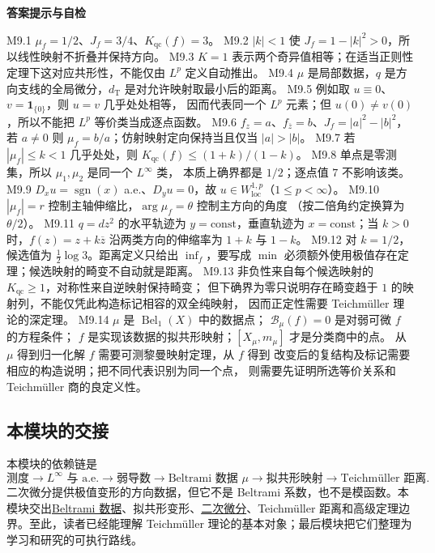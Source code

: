 \documentclass[UTF8,fontset=none,a4paper,11pt]{ctexart}
\theoremstyle{foundation-definition}
\theoremstyle{foundation-theorem}
\theoremstyle{foundation-proposition}
\theoremstyle{foundation-example}
\theoremstyle{foundation-remark}
\theoremstyle{foundation-theorem}
\newcommand{\term}[2]{\hyperref[#1]{#2}}
\newenvironment{answerkey}{%
\begin{mdframed}[backgroundcolor=examplebg,linecolor=examplepurple,linewidth=1.0pt,
  leftline=true,rightline=false,topline=false,bottomline=false,
  skipabove=7pt,skipbelow=8pt,innerleftmargin=10pt,innerrightmargin=8pt,
  innertopmargin=6pt,innerbottommargin=6pt]
{\sffamily\bfseries\color{examplepurple}答案提示与自检}\par\smallskip\small
}{\end{mdframed}}
\begin{document}
\begin{answerkey}
M9.1 \(\mu_f=1/2\)、\(J_f=3/4\)、\(K_{\mathrm{qc}}(f)=3\)。
M9.2 \(|k|<1\) 使 \(J_f=1-|k|^2>0\)，所以线性映射不折叠并保持方向。
M9.3 \(K=1\) 表示两个奇异值相等；在适当正则性定理下这对应共形性，不能仅由 \(L^p\) 定义自动推出。
M9.4 \(\mu\) 是局部数据，\(q\) 是方向支线的全局微分，\(d_{\mathrm T}\) 是对允许映射取最小后的距离。
M9.5 例如取 \(u\equiv0\)、\(v=\mathbf 1_{\{0\}}\)，则 \(u=v\) 几乎处处相等，
    因而代表同一个 \(L^p\) 元素；但 \(u(0)\ne v(0)\)，所以不能把 \(L^p\) 等价类当成逐点函数。
M9.6 \(f_z=a\)、\(f_{\overline z}=b\)、\(J_f=|a|^2-|b|^2\)，若 \(a\ne0\) 则
    \(\mu_f=b/a\)；仿射映射定向保持当且仅当 \(|a|>|b|\)。
M9.7 若 \(|\mu_f|\le k<1\) 几乎处处，则
    \(K_{\mathrm{qc}}(f)\le(1+k)/(1-k)\)。
M9.8 单点是零测集，所以 \(\mu_1,\mu_2\) 是同一个 \(L^\infty\) 类，
    本质上确界都是 \(1/2\)；逐点值 \(7\) 不影响该类。
M9.9 \(D_xu=\operatorname{sgn}(x)\) a.e.、\(D_yu=0\)，故
    \(u\in W^{1,p}_{\mathrm{loc}}\)（\(1\le p<\infty\)）。
M9.10 \(|\mu_f|=r\) 控制主轴伸缩比，\(\arg\mu_f=\theta\) 控制主方向的角度
    （按二倍角约定换算为 \(\theta/2\)）。
M9.11 \(q=dz^2\) 的水平轨迹为 \(y=\mathrm{const}\)，垂直轨迹为
    \(x=\mathrm{const}\)；当 \(k>0\) 时，\(f(z)=z+k\overline z\) 沿两类方向的伸缩率为
    \(1+k\) 与 \(1-k\)。
M9.12 对 \(k=1/2\)，候选值为 \(\frac12\log3\)。距离定义只给出
    \(\inf_f\)，要写成 \(\min\) 必须额外使用极值存在定理；候选映射的畸变不自动就是距离。
M9.13 非负性来自每个候选映射的 \(K_{\mathrm{qc}}\geq1\)，对称性来自逆映射保持畸变；
    但下确界为零只说明存在畸变趋于 \(1\) 的映射列，不能仅凭此构造标记相容的双全纯映射，
    因而正定性需要 Teichmüller 理论的深定理。
M9.14 \(\mu\) 是 \(\operatorname{Bel}_1(X)\) 中的数据点；
    \(\mathcal B_\mu(f)=0\) 是对弱可微 \(f\) 的方程条件；
    \(f\) 是实现该数据的拟共形映射；\([X_\mu,m_\mu]\) 才是分类商中的点。
    从 \(\mu\) 得到归一化解 \(f\) 需要可测黎曼映射定理，从 \(f\) 得到
    改变后的复结构及标记需要相应的构造说明；把不同代表识别为同一个点，
    则需要先证明所选等价关系和 Teichmüller 商的良定义性。
\end{answerkey}

\subsection{本模块的交接}

本模块的依赖链是
\[
\text{测度}
\longrightarrow
L^\infty\text{ 与 a.e.}
\longrightarrow
\text{弱导数}
\longrightarrow
\text{Beltrami 数据 }\mu
\longrightarrow
\text{拟共形映射}
\longrightarrow
\text{Teichmüller 距离}.
\]
二次微分提供极值变形的方向数据，但它不是 Beltrami 系数，也不是模函数。本模块交出\term{def:beltrami}{Beltrami 数据}、拟共形变形、\term{def:quadratic-differential}{二次微分}、Teichmüller 距离和高级定理边界。至此，读者已经能理解 Teichmüller 理论的基本对象；最后模块把它们整理为学习和研究的可执行路线。
\end{document}
